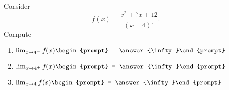 \documentclass{ximera}
\author{Bart Snapp}
\begin{document}
\begin{exercise}
Consider 
\[
f(x) = \frac{x^2+7 x+12}{(x-4)^2}.
\]
Compute
\begin{enumerate}
\item $\lim_{x\to 4^- } f(x) \begin{prompt} = \answer{\infty}\end{prompt}$
\item $\lim_{x\to 4^+ } f(x) \begin{prompt} = \answer{\infty}\end{prompt}$
\item $\lim_{x\to 4 } f(x) \begin{prompt} = \answer{\infty}\end{prompt}$
\end{enumerate}
\end{exercise}
\end{document}
